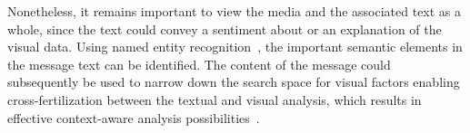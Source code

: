 \documentclass{acm_proc_article-sp}
\let\oldemph\emph
\renewcommand{\emph}[1]{\oldemph{\fontsize{9}{9}\selectfont #1}}
\newcommand{\inlinelistingsize}{\fontsize{8pt}{11pt}}
\let\oldttdefault\ttdefault
\renewcommand{\ttdefault}{pcr}
\let\oldurl\url
\renewcommand{\url}[1]{\inlinelistingsize\oldurl{#1}}
\begin{document}

Nonetheless, it remains important to view the media and the associated text as a whole, since the text could convey a sentiment about or an explanation of the visual data. Using named entity recognition~\cite{NERD,AddingMeaningToMicroposts}, the important semantic elements in the message text can be identified. The content of the message could subsequently be used to narrow down the search space for visual factors enabling cross-fertilization between the textual and visual analysis, which results in effective context-aware analysis possibilities~\cite{verborgh_mtap_2011}.




\let\ttdefault\oldttdefault
\let\url\oldurl




\balancecolumns
\end{document}
